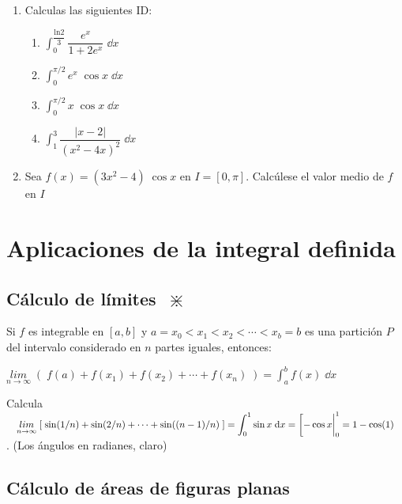 \begin{enumerate}
\item Calculas las siguientes ID:
\begin{multicols}{2}
\begin{enumerate}
\item $\displaystyle\int_0^{\dfrac {\mathrm{ln} 2}{3}}  \dfrac {e^x}{1+2e^x}\; \dd x$
\item $\displaystyle\int_0^{\pi/2} e^x \; \cos x \; \dd x$
\item $\displaystyle\int_0^{\pi/2} x\; \cos x \; \dd x$
\item $\displaystyle\int_1^3 \dfrac {|x-2|}{(x^2-4x)^2}\; \dd x$
\end{enumerate}	
\end{multicols}
\item Sea $f(x)=(3x^2-4)\; \cos x$ en $I=[0,\pi]$. Calcúlese el valor medio de $f$ en $I$
\rightline{\textcolor{gris}{Solución: $-6$}}
\end{enumerate}


\section{Aplicaciones de la integral definida}
\subsection{Cálculo de límites $\; \divideontimes$}

Si $f $ es integrable en $[a,b]$ y $a=x_0<x_1<x_2<\cdots <x_b=b$ es una partición $P$ del intervalo considerado en $n$ partes iguales, entonces:

$\displaystyle \underset{n \to \infty}{lim}\;{\left( \; f(a)+f(x_1)+f(x_2)+ \cdots + f(x_n) \;  \right)}=\int_a^b f(x)\; \dd x$

\begin{ejem}
Calcula $\quad \displaystyle \underset{n\to \infty}{lim}\;{\left[  \; \sin (1/n) + \sin (2/n)+ \cdots + \sin ((n-1)/n)  \; \right]} = \int_0^1 \sin x \; \dd x = \eval[-\cos x|_0^1=1-\cos(1)	\quad $. \textcolor{gris}{(Los ángulos en radianes, claro)}
\end{ejem}

\subsection{Cálculo de áreas de figuras planas}


